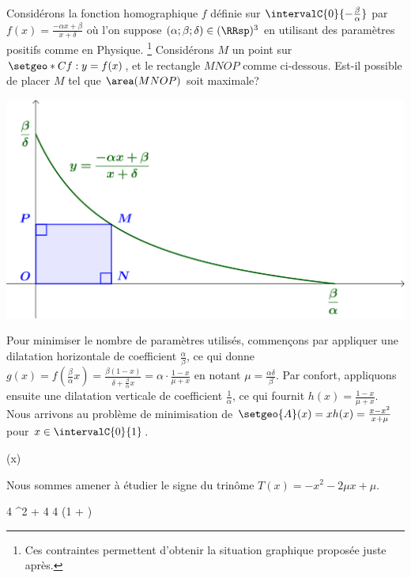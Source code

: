 Considérons la fonction homographique $f$ définie sur $\intervalC{0}{- \frac{\beta}{\alpha}}$ par $f(x) = \frac{- \alpha x + \beta}{x + \delta}$ où l'on suppose $(\alpha ; \beta ; \delta) \in (\RRsp)^3$ en utilisant des paramètres positifs comme en Physique.%
\footnote{
	Ces contraintes permettent d'obtenir la situation graphique proposée juste après.
}
%
Considérons $M$ un point sur $\setgeo*{C}{f}: y = f(x)$, et le rectangle $MNOP$ comme ci-dessous. Est-il possible de placer $M$ tel que $\area(MNOP)$ soit maximale?

\smallskip

\begin{center}
	\includegraphics[scale=.67]{goal.png}
\end{center}

Pour minimiser le nombre de paramètres utilisés,
commençons par appliquer une dilatation horizontale de coefficient $\frac{\alpha}{\beta}$,
ce qui donne 
$g(x) = f( \frac{\beta}{\alpha} x ) 
      = \frac{\beta(1 - x)}{\delta + \frac{\beta}{\alpha} x}
      = \alpha \cdot \frac{1 - x}{\mu + x}$
en notant $\mu = \frac{\alpha \delta}{\beta}$.
Par confort,
appliquons ensuite une dilatation verticale de coefficient $\frac{1}{\alpha}$,
ce qui fournit 
$h(x) = \frac{1 - x}{\mu + x}$.
%
Nous arrivons au problème de minimisation de
$\setgeo{A}(x) = x h(x) = \frac{x - x^2}{x + \mu}$
pour $x \in \intervalC{0}{1}$.

\begin{stepcalc}[style=sar]
	(x)
\explnext{}
\explnext{}
\end{stepcalc}

Nous sommes amener à étudier le signe du trinôme
$T(x) = - x^2 - 2 \mu x + \mu$.

\begin{stepcalc}[style=sar]
	\Delta
\explnext{}
	4 \mu^2 + 4 \mu
\explnext{}
	4 \mu (1 + \mu)
\end{stepcalc}

